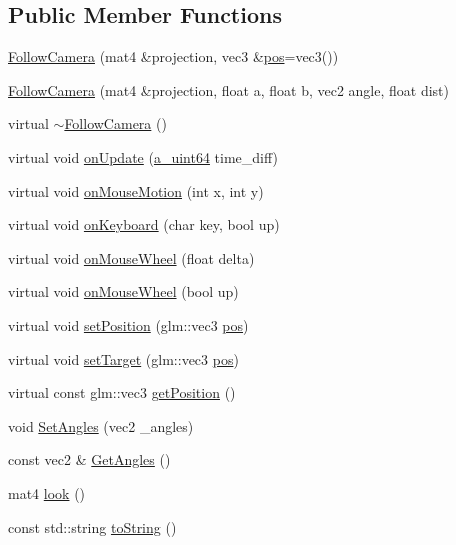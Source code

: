 \subsection*{Public Member Functions}
\begin{DoxyCompactItemize}
\item 
\hyperlink{class_agmd_1_1_follow_camera_a8f2e873b4d1d046e1a15b472e6f6f2ea}{Follow\+Camera} (mat4 \&projection, vec3 \&\hyperlink{_examples_2_planet_2_app_8cpp_aa8a1c0491559faca4ebd0881575ae7f0}{pos}=vec3())
\item 
\hyperlink{class_agmd_1_1_follow_camera_afc8c65d1d89b6dbb8260abec3b3abbac}{Follow\+Camera} (mat4 \&projection, float a, float b, vec2 angle, float dist)
\item 
virtual \hyperlink{class_agmd_1_1_follow_camera_ad0758578f1cf325d7498296700b72e1d}{$\sim$\+Follow\+Camera} ()
\item 
virtual void \hyperlink{class_agmd_1_1_follow_camera_ab79070a449a69cb3efe591aa631cb908}{on\+Update} (\hyperlink{_common_defines_8h_a6c5192ec3c55d6e5b13d2dbaa082bdea}{a\+\_\+uint64} time\+\_\+diff)
\item 
virtual void \hyperlink{class_agmd_1_1_follow_camera_a3e1d519781c295ac1f42f462b769c9c5}{on\+Mouse\+Motion} (int x, int y)
\item 
virtual void \hyperlink{class_agmd_1_1_follow_camera_a3186556fa90cb4f9c49d59afe609f3dd}{on\+Keyboard} (char key, bool up)
\item 
virtual void \hyperlink{class_agmd_1_1_follow_camera_a235dd31d95e9363785c25660952c1b9b}{on\+Mouse\+Wheel} (float delta)
\item 
virtual void \hyperlink{class_agmd_1_1_follow_camera_ac4cc280147816950f48d2f375f51a65f}{on\+Mouse\+Wheel} (bool up)
\item 
virtual void \hyperlink{class_agmd_1_1_follow_camera_ad32b73bb67f8155d20978b7bbd8af536}{set\+Position} (glm\+::vec3 \hyperlink{_examples_2_planet_2_app_8cpp_aa8a1c0491559faca4ebd0881575ae7f0}{pos})
\item 
virtual void \hyperlink{class_agmd_1_1_follow_camera_ae67f0bb92c39993a01f3cdbbbdeffeb6}{set\+Target} (glm\+::vec3 \hyperlink{_examples_2_planet_2_app_8cpp_aa8a1c0491559faca4ebd0881575ae7f0}{pos})
\item 
virtual const glm\+::vec3 \hyperlink{class_agmd_1_1_follow_camera_a00844fc6f5c31935b3590c781d16f90c}{get\+Position} ()
\item 
void \hyperlink{class_agmd_1_1_follow_camera_a49778fef0864dba27545ad66491eeae7}{Set\+Angles} (vec2 \+\_\+angles)
\item 
const vec2 \& \hyperlink{class_agmd_1_1_follow_camera_aaaf5e69d63b0673842711333940c057d}{Get\+Angles} ()
\item 
mat4 \hyperlink{class_agmd_1_1_follow_camera_a5e5a5e8c8578dd7ee00d2139318d35b9}{look} ()
\item 
const std\+::string \hyperlink{class_agmd_1_1_follow_camera_a78d7380ca1be7ca3fd26447f32586a23}{to\+String} ()
\end{DoxyCompactItemize}
